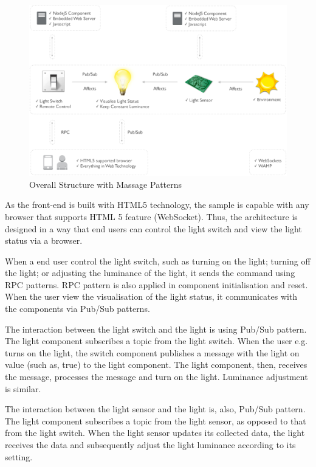 \begin{figure}[ht]
  \begin{center}
    \includegraphics[width=1\textwidth]{images/message-pattern-overall-structure.pdf}
    \caption{Overall Structure with Massage Patterns}
    \label{fig:message-pattern-overall-structure}
  \end{center}
\end{figure}

As the front-end is built with HTML5 technology, the sample is capable with any browser that supports HTML 5 feature (WebSocket). Thus, the architecture is designed in a way that end users can control the light switch and view the light status via a browser. 

When a end user control the light switch, such as turning on the light; turning off the light; or adjusting the luminance of the light, it sends the command using RPC patterns. RPC pattern is also applied in component initialisation and reset. When the user view the visualisation of the light status, it communicates with the components via Pub/Sub patterns.

The interaction between the light switch and the light is using Pub/Sub pattern. The light component subscribes a topic from the light switch. When the user e.g. turns on the light, the switch component publishes a message with the light on value (such as, true) to the light component. The light component, then, receives the message, processes the message and turn on the light. Luminance adjustment is similar.

The interaction between the light sensor and the light is, also, Pub/Sub pattern. The light component subscribes a topic from the light sensor, as opposed to that from the light switch. When the light sensor updates its collected data, the light receives the data and subsequently adjust the light luminance according to its setting.

